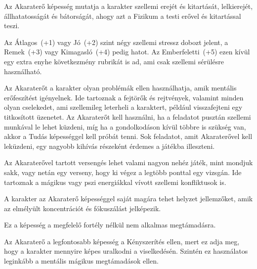 
Az Akaraterő képesség mutatja a karakter szellemi erejét és kitartását, lelkierejét, állhatatosságát és bátorságát, ahogy azt a Fizikum a testi erővel és kitartással teszi.

Az Átlagos~(+1) vagy Jó~(+2) szint négy szellemi stressz dobozt jelent, a Remek~(+3) vagy Kimagasló~(+4) pedig hatot. Az Emberfeletti~(+5) ezen kívül egy extra enyhe következmény rubrikát is ad, ami csak szellemi sérülésre használható.

\overcome Az Akaraterőt a karakter olyan problémák ellen használhatja, amik mentális erőfeszítést igényelnek. Ide tartoznak a fejtörők és rejtvények, valamint minden olyan cselekedet, ami szellemileg leterheli a karaktert, például visszafejteni egy titkosított üzenetet. Az Akaraterőt kell használni, ha a feladatot pusztán szellemi munkával le lehet küzdeni, míg ha a gondolkodáson kívül többre is szükség van, akkor a Tudás képességgel kell próbát tenni. Sok feladatot, amit Akaraterővel kell leküzdeni, egy nagyobb kihívás részeként érdemes a játékba illeszteni.

Az Akaraterővel tartott versengés lehet valami nagyon nehéz játék, mint mondjuk sakk, vagy netán egy verseny, hogy ki végez a legtöbb ponttal egy vizsgán. Ide tartoznak a mágikus vagy pszi energiákkal vívott szellemi konfliktusok is.

\advantage A karakter az Akaraterő képességgel saját magára tehet helyzet jellemzőket, amik az elmélyült koncentrációt és fókuszálást jelképezik.

\noindent Ez a képesség a megfelelő fortély nélkül nem alkalmas  megtámadásra.

 Az Akaraterő a legfontosabb képesség a Kényszerítés ellen, mert ez adja meg, hogy a karakter mennyire képes uralkodni a viselkedésén. Szintén ez használatos leginkább a mentális mágikus megtámadások ellen.



